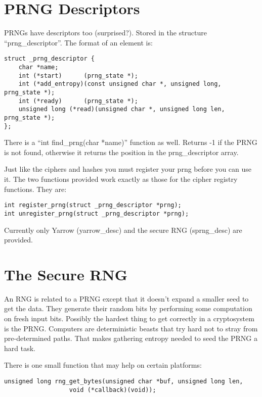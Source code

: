 \documentclass{book}
\begin{document}
\section{PRNG Descriptors}
PRNGs have descriptors too (surprised?). Stored in the structure ``prng\_descriptor''.  The format of an element is:
\begin{verbatim}
struct _prng_descriptor {
    char *name;
    int (*start)      (prng_state *);
    int (*add_entropy)(const unsigned char *, unsigned long, prng_state *);
    int (*ready)      (prng_state *);
    unsigned long (*read)(unsigned char *, unsigned long len, prng_state *);
};
\end{verbatim}

There is a ``int find\_prng(char *name)'' function as well.  Returns -1 if the PRNG is not found, otherwise it returns
the position in the prng\_descriptor array.

Just like the ciphers and hashes you must register your prng before you can use it.  The two functions provided work
exactly as those for the cipher registry functions.  They are:
\begin{verbatim}
int register_prng(struct _prng_descriptor *prng);
int unregister_prng(struct _prng_descriptor *prng);
\end{verbatim}
Currently only Yarrow (yarrow\_desc) and the secure RNG (sprng\_desc) are provided.

\section{The Secure RNG}
An RNG is related to a PRNG except that it doesn't expand a smaller seed to get the data.  They generate their random bits
by performing some computation on fresh input bits.  Possibly the hardest thing to get correctly in a cryptosystem is the 
PRNG.  Computers are deterministic beasts that try hard not to stray from pre-determined paths.  That makes gathering 
entropy needed to seed the PRNG a hard task.  

There is one small function that may help on certain platforms:
\begin{verbatim}
unsigned long rng_get_bytes(unsigned char *buf, unsigned long len, 
                  void (*callback)(void));
\end{verbatim}
\end{document}
